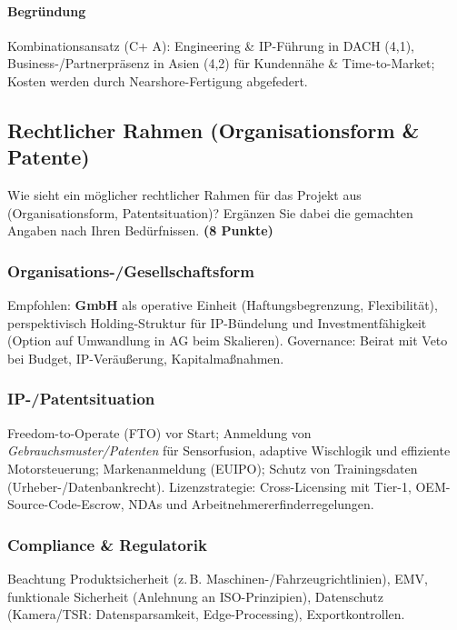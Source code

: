 \documentclass[
%
ngerman %
%
numeric %
]{wbh-assignment}
\begin{document}
\paragraph{Begründung}
Kombinationsansatz (C+ A): Engineering \& IP-Führung in DACH (4{,}1), Business-/Partnerpräsenz in Asien (4{,}2) für Kundennähe \& Time-to-Market; Kosten werden durch Nearshore-Fertigung abgefedert.

\clearpage

\subsection{Rechtlicher Rahmen (Organisationsform \& Patente)}
\begin{aufgabenstellung}
Wie sieht ein möglicher rechtlicher Rahmen für das Projekt aus (Organisationsform, Patentsituation)? Ergänzen Sie dabei die gemachten Angaben nach Ihren Bedürfnissen. \textbf{(8 Punkte)}
\end{aufgabenstellung}

\vspace*{5mm}

\subsubsection{Organisations-/Gesellschaftsform}
Empfohlen: \textbf{GmbH} als operative Einheit (Haftungsbegrenzung, Flexibilität), perspektivisch Holding-Struktur für IP-Bündelung und Investmentfähigkeit (Option auf Umwandlung in AG beim Skalieren). Governance: Beirat mit Veto bei Budget, IP-Veräußerung, Kapitalmaßnahmen.

\subsubsection{IP-/Patentsituation}
Freedom-to-Operate (FTO) vor Start; Anmeldung von \emph{Gebrauchsmuster/Patenten} für Sensorfusion, adaptive Wischlogik und effiziente Motorsteuerung; Markenanmeldung (EUIPO); Schutz von Trainingsdaten (Urheber-/Datenbankrecht). Lizenzstrategie: Cross-Licensing mit Tier-1, OEM-Source-Code-Escrow, NDAs und Arbeitnehmererfinderregelungen.

\subsubsection{Compliance \& Regulatorik}
Beachtung Produktsicherheit (z.\,B. Maschinen-/Fahrzeugrichtlinien), EMV, funktionale Sicherheit (Anlehnung an ISO-Prinzipien), Datenschutz (Kamera/TSR: Datensparsamkeit, Edge-Processing), Exportkontrollen.
\end{document}
